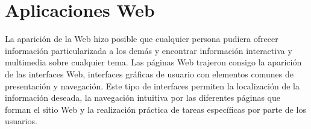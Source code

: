 
\section{Aplicaciones Web}
La aparición de la Web hizo posible que cualquier persona pudiera ofrecer información particularizada a los demás y encontrar información interactiva y multimedia sobre cualquier tema. Las páginas Web trajeron consigo la aparición de las interfaces Web, interfaces gráficas de usuario con elementos comunes de presentación y navegación. Este tipo de interfaces permiten la localización de la información deseada, la navegación intuitiva por las diferentes páginas que forman el sitio Web y la realización práctica de tareas específicas por parte de los usuarios.




